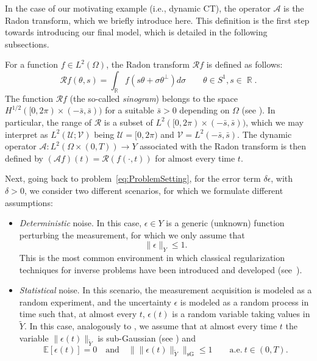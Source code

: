 \documentclass[11pt,a4paper]{article}
\numberwithin{equation}{section}
\newcounter{MotEx}
\DeclareMathOperator{\R}{\mathbb{R}}
\newcommand{\cA}{\mathscr{A}}
\newcommand{\E}{\mathbb{E}}
\begin{document}
In the case of our motivating example (i.e., dynamic CT), the operator $\cA$ is the Radon transform, which we briefly introduce here. This definition is the first step towards introducing our final model, which is detailed in the following subsections.

\begin{MotExample}
\label{motex:RadonTransform}

For a function $f \in L^2(\Omega)$, the Radon transform $\mathcal{R} f$ is defined as follows:
\[
\mathcal{R}f (\theta,s) = \int_{\R} f(s \theta + \sigma \theta^\perp) d\sigma \qquad \theta \in S^1, s \in \R.
\]
The function $\mathcal{R}f$ (the so-called \textit{sinogram}) belongs to the space $H^{1/2}([0,2\pi)\times(-\bar{s},\bar{s}))$ for a suitable $\bar{s} > 0$ depending on $\Omega$ (see \cite[Theorem 2.10]{natterer2001mathematical}). In particular, the range of $\mathcal{R}$ is a subset of $L^2([0,2\pi)\times(-\bar{s},\bar{s}))$, which we may interpret as $L^2(\mathcal{U};\mathcal{V})$ being $\mathcal{U}=[0,2\pi)$ and $\mathcal{V} = L^2(-\bar{s},\bar{s})$.
The dynamic operator $\cA \colon L^2(\Omega \times (0,T))\rightarrow Y$ associated with the Radon transform is then defined by $(\cA f)(t) = \mathcal{R}(f(\cdot,t))$ for almost every time $t$.

\end{MotExample}

Next, going back to problem~\eqref{eq:ProblemSetting}, for the error term $\delta \epsilon$, with $\delta > 0$, we consider two different scenarios, for which we formulate different assumptions:
\begin{itemize}
    \item \textit{Deterministic} noise. In this case, $\epsilon \in Y$ is a generic (unknown) function perturbing the measurement, for which we only assume that
    \begin{equation}
     \| \epsilon \|_Y \leq 1.
        \label{eq:noise_det}
    \end{equation}
    This is the most common environment in which classical regularization techniques for inverse problems have been introduced and developed (see~\cite{engl1996regularization}).
    \item \textit{Statistical} noise. In this scenario, the measurement acquisition is modeled as a random experiment, and the uncertainty $\epsilon$ is modeled as a random process in time such that, at almost every $t$, $\epsilon(t)$ is a random variable taking values in $\tilde{Y}$. 
    In this case, analogously to \cite{bubba2021}, we assume that at almost every time $t$ the variable $\| \epsilon(t)\|_{\tilde{Y}}$ 
    is sub-Gaussian (see \cite[Definition 2.5.6]{vershynin2018high}) 
    and
    \begin{equation}
    \E[\epsilon(t)] = 0 \quad \text{and} \quad \big\| \| \epsilon(t) \|_{\tilde{Y}}\big\|_{\text{sG}}  \leq 1 \qquad \text{a.e.}\ t \in (0,T).
        \label{eq:noise_stat}
    \end{equation}

\end{itemize}
\end{document}
